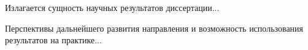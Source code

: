 \Conclusion

\ConclusionResults
Излагается сущность научных результатов диссертации...

\ConclusionRecomendation
Перспективы дальнейшего развития направления и возможность использования результатов на практике...
